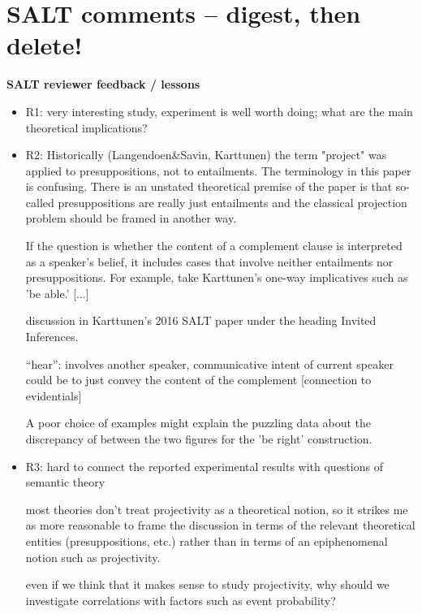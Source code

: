 \documentclass[11pt,fleqn]{article}
\newcommand{\6}{\mbox{$[\hspace*{-.6mm}[$}}
\newcommand{\9}{\mbox{$]\hspace*{-.6mm}]$}}
\begin{document}
{\begin{enumerate}[leftmargin=3ex,itemsep=-2pt]
\begin{multicols}{2}
\end{multicols}

\end{enumerate}

\section{SALT comments -- digest, then delete!}


{\bf SALT reviewer feedback / lessons}

\begin{itemize}

\item R1: very interesting study, experiment is well worth doing; what are the main theoretical implications?

\item R2: Historically (Langendoen\&Savin, Karttunen) the term "project" was applied to presuppositions, not to entailments. The terminology in this paper is confusing. There is an unstated theoretical premise of the paper is that so-called presuppositions are really just entailments and the classical projection problem should be framed in another way.

If the question is whether the content of a complement clause is interpreted as a speaker's belief, it includes cases that involve neither entailments nor presuppositions. For example, take Karttunen's one-way implicatives such as 'be able.'  [...]

discussion in Karttunen’s 2016 SALT paper under the heading Invited Inferences.

``hear'': involves another speaker, communicative intent of current speaker could be to just convey the content of the complement [connection to evidentials]

A poor choice of examples might explain the puzzling data about the discrepancy of between the two figures for the 'be right' construction. 

\item R3: hard to connect the reported experimental results with questions of semantic theory

most theories don't treat projectivity as a theoretical notion, so it strikes me as more reasonable to frame the discussion in terms of the relevant theoretical entities (presuppositions, etc.) rather than in terms of an epiphenomenal notion such as projectivity.

even if we think that it makes sense to study projectivity, why should we investigate correlations with factors such as event probability?


\end{itemize}}
\end{document}

